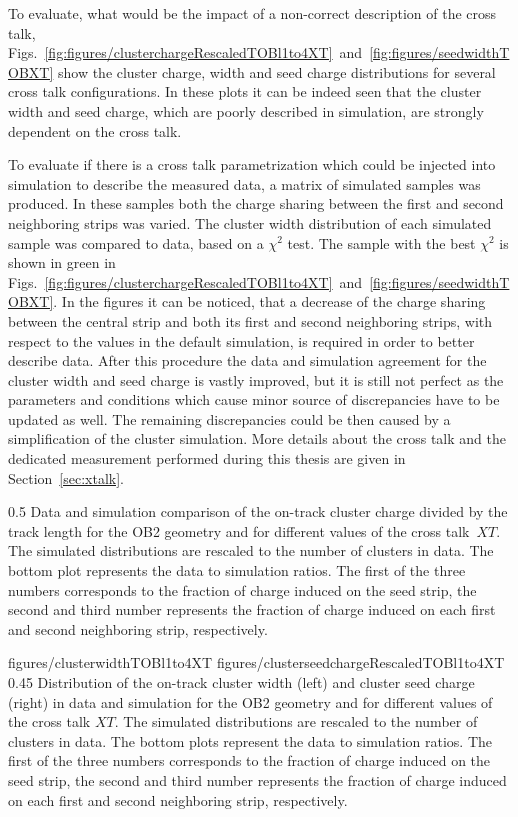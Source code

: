 To evaluate, what would be the impact of a non-correct description of the cross talk, Figs.~\ref{fig:figures/clusterchargeRescaledTOBl1to4XT}~and~\ref{fig:figures/seedwidthTOBXT} show the cluster charge, width and seed charge distributions for several cross talk configurations. In these plots it can be indeed seen that the cluster width and seed charge, which are poorly described in simulation, are strongly dependent on the cross talk. 

To evaluate if there is a cross talk parametrization which could be injected into simulation to describe the measured data, a matrix of simulated samples was produced. In these samples both the charge sharing between the first and second neighboring strips was varied. The cluster width distribution of each simulated sample was compared to data, based on a $\chi^{2}$ test. The sample with the best $\chi^{2}$ is shown in green in Figs.~\ref{fig:figures/clusterchargeRescaledTOBl1to4XT}~and~\ref{fig:figures/seedwidthTOBXT}. In the figures it can be noticed, that a decrease of the charge sharing between the central strip and both its first and second neighboring strips, with respect to the values in the default simulation, is required in order to better describe data. After this procedure the data and simulation agreement for the cluster width and seed charge is vastly improved, but it is still not perfect as the parameters and conditions which cause minor source of discrepancies have to be updated as well. The remaining discrepancies could be then caused by a simplification of the cluster simulation. More details about the cross talk and the dedicated measurement performed during this thesis are given in Section~\ref{sec:xtalk}.


                 {0.5}       %
                 { Data and simulation comparison of the on-track cluster charge divided by the track length for the OB2 geometry and for different values of the cross talk~$XT$.  The simulated distributions are rescaled to the number of clusters in data.  The bottom plot represents the data to simulation ratios. The first of the three numbers corresponds to the fraction of charge induced on the seed strip, the second and third number represents the fraction of charge induced on each first and second neighboring strip, respectively. }

                 {figures/clusterwidthTOBl1to4XT}
                 {figures/clusterseedchargeRescaledTOBl1to4XT} %
                 {0.45}       %
                 { Distribution of the on-track cluster width (left) and cluster seed charge (right) in data and simulation for the OB2 geometry and for different values of the cross talk $XT$.  The simulated distributions are rescaled to the number of clusters in data.  The bottom plots represent the data to simulation ratios.  The first of the three numbers corresponds to the fraction of charge induced on the seed strip, the second and third number represents the fraction of charge induced on each first and second neighboring strip, respectively. }

